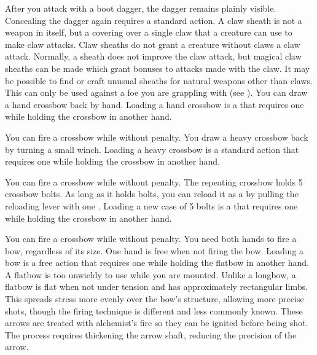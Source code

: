         After you attack with a boot dagger, the dagger remains plainly visible.
        Concealing the dagger again requires a standard action.
         A claw sheath is not a weapon in itself, but a covering over a single claw that a creature can use to make claw attacks. Claw sheaths do not grant a creature without claws a claw attack. Normally, a sheath does not improve the claw attack, but magical claw sheaths can be made which grant bonuses to attacks made with the claw. It may be possible to find or craft unusual sheaths for natural weapons other than claws.
         This  can only be used against a foe you are grappling with (see ).
         You can draw a hand crossbow back by hand. Loading a hand crossbow is a  that requires one  while holding the crossbow in another hand.
        \par You can fire a crossbow while \prone without penalty.
         You draw a heavy crossbow back by turning a small winch. Loading a heavy crossbow is a standard action that requires one  while holding the crossbow in another hand.
        \par You can fire a crossbow while \prone without penalty.
         The repeating crossbow holds 5 crossbow bolts. As long as it holds bolts, you can reload it as a  by pulling the reloading lever with one . Loading a new case of 5 bolts is a  that requires one  while holding the crossbow in another hand.
        \par You can fire a crossbow while \prone without penalty.
         You need both hands to fire a bow, regardless of its size. One hand is free when not firing the bow. Loading a bow is a free action that requires one  while holding the flatbow in another hand. A flatbow is too unwieldy to use while you are mounted.
        Unlike a longbow, a flatbow is flat when not under tension and has approximately rectangular limbs.
        This spreads stress more evenly over the bow's structure, allowing more precise shots, though the firing technique is different and less commonly known.
         These arrows are treated with alchemist's fire so they can be ignited before being shot.
        The process requires thickening the arrow shaft, reducing the precision of the arrow.

